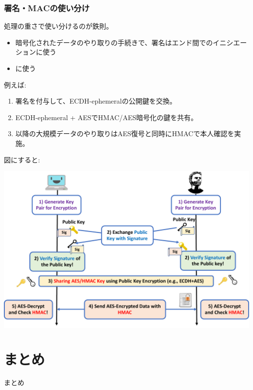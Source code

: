 \documentclass[12pt,dvipdfmx]{beamer}
\begin{document}
\begin{frame}
\frametitle{署名・MACの使い分け}
処理の重さで使い分けるのが鉄則。

\begin{itemize}
 \item 暗号化されたデータのやり取りの手続きで、\alert{署名はエンド間でのイニシエーション}に使う
 \item {}に使う
\end{itemize}

\vspace{2ex}

例えば:
\begin{enumerate}
\item 署名を付与して、ECDH-ephemeralの公開鍵を交換。
\item ECDH-ephemeral + AESでHMAC/AES暗号化の鍵を共有。
\item 以降の大規模データのやり取りはAES復号と同時にHMACで本人確認を実施。
\end{enumerate}

\end{frame}
\begin{frame}
図にすると:
\begin{center}
\includegraphics[width=\linewidth]{Figs/key-exchange-flow01.pdf}
\end{center}
\end{frame}


\section{まとめ}
\begin{frame}
 \centering
 {\Large まとめ}
\end{frame}
\end{document}
